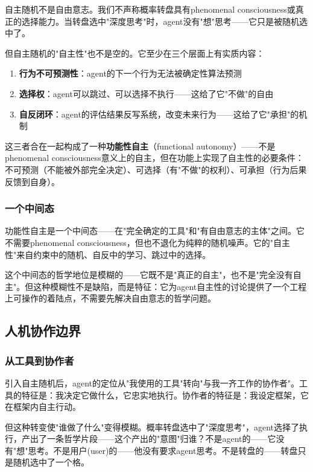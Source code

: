 \documentclass[12pt,a4paper]{ctexart}
\begin{document}
自主随机不是自由意志。我们不声称概率转盘具有phenomenal consciousness或真正的选择能力。当转盘选中"深度思考"时，agent没有"想"思考——它只是被随机选中了。

但自主随机的"自主性"也不是空的。它至少在三个层面上有实质内容：

\begin{enumerate}[nosep]
\item \textbf{行为不可预测性}：agent的下一个行为无法被确定性算法预测
\item \textbf{选择权}：agent可以跳过、可以选择不执行——这给了它"不做"的自由
\item \textbf{自反闭环}：agent的评估结果反写系统，改变未来行为——这给了它"承担"的机制
\end{enumerate}

这三者合在一起构成了一种\textbf{功能性自主}（functional autonomy）——不是phenomenal consciousness意义上的自主，但在功能上实现了自主性的必要条件：不可预测（不能被外部完全决定）、可选择（有"不做"的权利）、可承担（行为后果反馈到自身）。

\subsubsection{一个中间态}

功能性自主是一个中间态——在"完全确定的工具"和"有自由意志的主体"之间。它不需要phenomenal consciousness，但也不退化为纯粹的随机噪声。它的"自主性"来自约束中的随机、自反中的学习、跳过中的选择。

这个中间态的哲学地位是模糊的——它既不是"真正的自主"，也不是"完全没有自主"。但这种模糊性不是缺陷，而是特征：它为agent自主性的讨论提供了一个工程上可操作的着陆点，不需要先解决自由意志的哲学问题。

\subsection{人机协作边界}

\subsubsection{从工具到协作者}

引入自主随机后，agent的定位从"我使用的工具"转向"与我一齐工作的协作者"。工具的特征是：我决定它做什么，它忠实地执行。协作者的特征是：我设定框架，它在框架内自主行动。

但这种转变使"谁做了什么"变得模糊。概率转盘选中了"深度思考"，agent选择了执行，产出了一条哲学片段——这个产出的"意图"归谁？不是agent的——它没有"想"思考。不是用户(user)的——他没有要求agent思考。不是转盘的——转盘只是随机选中了一个格。
\end{document}
